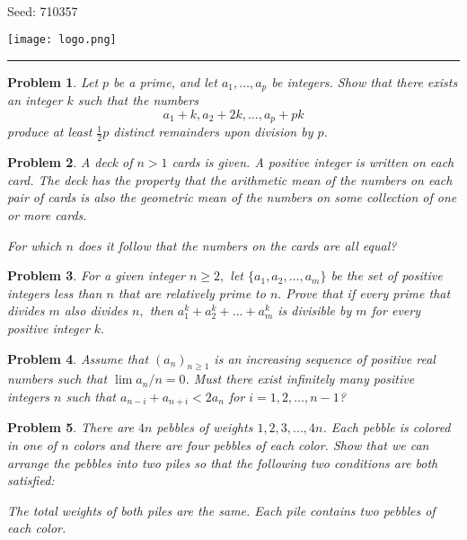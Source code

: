 \documentclass[12pt]{article}
\newtheorem{opg}{Problem}
\begin{document}
\parbox{0.6\textwidth}{ \\[2ex] {\Large Seed: 710357}}
\parbox{0.4\textwidth}{\texttt{[image: logo.png]}}

\hrule

\begin{opg}
Let $p$ be a prime, and let $a_1, \dots, a_p$ be integers. Show that there exists an integer $k$ such that the numbers \[a_1 + k, a_2 + 2k, \dots, a_p + pk\]produce at least $\tfrac{1}{2} p$ distinct remainders upon division by $p$.




\end{opg}
\begin{opg}
A deck of $n > 1$ cards is given. A positive integer is written on each card. The deck has the property that the arithmetic mean of the numbers on each pair of cards is also the geometric mean of the numbers on some collection of one or more cards. 

For which $n$ does it follow that the numbers on the cards are all equal?


\end{opg}
\begin{opg}
For a given integer $n\ge 2,$ let $\{a_1,a_2,…,a_m\}$ be the set of positive integers less than $n$ that are relatively prime to $n.$ Prove that if every prime that divides $m$ also divides $n,$ then $a_1^k+a_2^k + \dots + a_m^k$ is divisible by $m$ for every positive integer $k.$




\end{opg}
\begin{opg}
Assume that $(a_n)_{n\geq 1}$ is an increasing sequence of
positive real numbers such that
$\lim a_n/n=0$.  Must there exist infinitely many positive integers
$n$ such that $a_{n-i}+a_{n+i}<2a_n$ for $i=1,2,\ldots,n-1$?

\end{opg}
\begin{opg}
There are $4n$ pebbles of weights $1, 2, 3, . . . , 4n$. Each pebble is colored in one of $n$ colors and there are four pebbles of each color. Show that we can arrange the pebbles into two piles so that the following two conditions are both satisfied:


The total weights of both piles are the same.
Each pile contains two pebbles of each color.

\end{opg}
\end{document}
